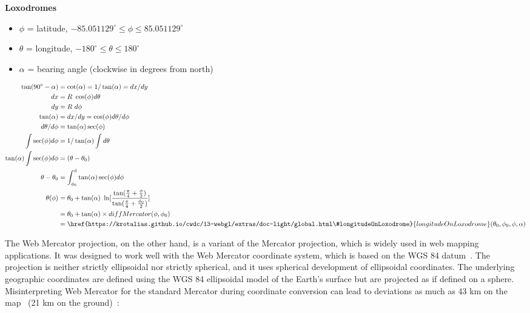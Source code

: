 \documentclass[onecolumn,3p]{elsarticle}
\begin{document}
\vspace{0.5cm}
\textbf{Loxodromes~\cite{Veness26}}

\begin{itemize}
    \item $\phi$ = latitude, $-85.051129^\circ \leq \phi \leq 85.051129^\circ$
    \item $\theta$ = longitude, $-180^\circ \leq \theta \leq 180^\circ$
    \item $\alpha$ = bearing angle (clockwise in degrees from north)
    \end{itemize}

    \begin{equation}
    \begin{split}
     \tan(90^\circ - \alpha) &= \cot(\alpha) = 1/\tan(\alpha) = dx/dy \\
     dx &= R\ \cos(\phi) d\theta \\
     dy &= R\ d\phi \\
     \tan(\alpha) &= dx/dy = \cos(\phi) d\theta/d\phi \\
     d\theta/d\phi &= \tan(\alpha) \sec(\phi) \\
     \int \sec(\phi) d\phi &= 1/\tan(\alpha) \int d\theta \\
     \tan(\alpha) \int \sec(\phi) d\phi &= (\theta - \theta_{0}) \\
     \theta - \theta_{0} &= \int_{\phi_{0}}^{\phi} \tan(\alpha) \sec(\phi) d\phi \\
     \theta(\phi) &= \theta_{0} + \tan(\alpha)\ \ln [\frac{\tan (\frac{\pi}{4} + \frac{\phi}{2})} {\tan (\frac{\pi}{4} + \frac{\phi_{0}}{2})}] \\
     &= \theta_{0} + \tan(\alpha) \times diffMercator(\phi, \phi_{0}) \\
     &= \href{https://krotalias.github.io/cwdc/13-webgl/extras/doc-light/global.html\#longitudeOnLoxodrome}{longitudeOnLoxodrome}(\theta_{0}, \phi_{0}, \phi, \alpha)
    \end{split}
    \end{equation}

The Web Mercator projection, on the other hand, is a variant of the Mercator projection,
which is widely used in web mapping applications.
It was designed to work well with the Web Mercator coordinate system,
which is based on the WGS 84 datum~\cite{wgs84}. The projection is neither strictly ellipsoidal nor strictly spherical,
and it uses spherical development of ellipsoidal coordinates.
The underlying geographic coordinates are defined using the WGS 84 ellipsoidal model
of the Earth's surface but are projected as if defined on a sphere.
Misinterpreting Web Mercator for the standard Mercator during coordinate conversion
can lead to deviations as much as 43 km on the map~\cite{stefanakis2017web} (21 km on the ground)~\cite{EPSG3857}:
\end{document}
